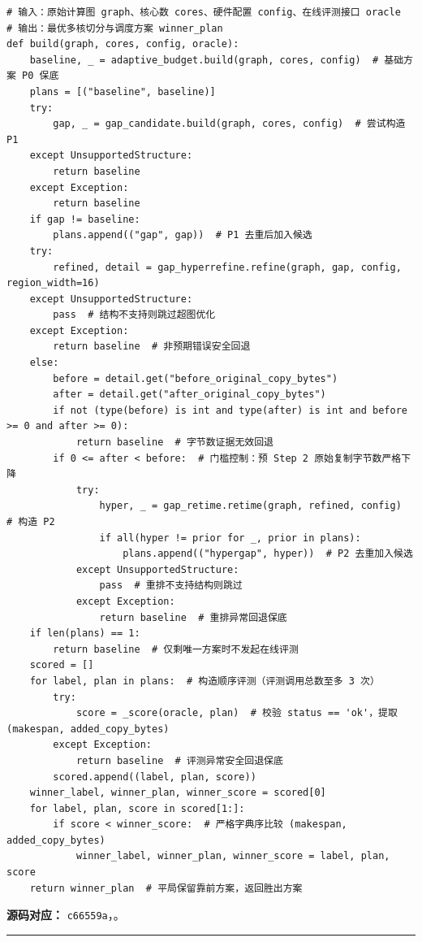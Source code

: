 \documentclass[anonymous,withtoc]{gmcm2026}
\begin{document}
\begin{lstlisting}[style=paperpseudo]
# 输入：原始计算图 graph、核心数 cores、硬件配置 config、在线评测接口 oracle
# 输出：最优多核切分与调度方案 winner_plan
def build(graph, cores, config, oracle):
    baseline, _ = adaptive_budget.build(graph, cores, config)  # 基础方案 P0 保底
    plans = [("baseline", baseline)]
    try:
        gap, _ = gap_candidate.build(graph, cores, config)  # 尝试构造 P1
    except UnsupportedStructure:
        return baseline
    except Exception:
        return baseline
    if gap != baseline:
        plans.append(("gap", gap))  # P1 去重后加入候选
    try:
        refined, detail = gap_hyperrefine.refine(graph, gap, config, region_width=16)
    except UnsupportedStructure:
        pass  # 结构不支持则跳过超图优化
    except Exception:
        return baseline  # 非预期错误安全回退
    else:
        before = detail.get("before_original_copy_bytes")
        after = detail.get("after_original_copy_bytes")
        if not (type(before) is int and type(after) is int and before >= 0 and after >= 0):
            return baseline  # 字节数证据无效回退
        if 0 <= after < before:  # 门槛控制：预 Step 2 原始复制字节数严格下降
            try:
                hyper, _ = gap_retime.retime(graph, refined, config)  # 构造 P2
                if all(hyper != prior for _, prior in plans):
                    plans.append(("hypergap", hyper))  # P2 去重加入候选
            except UnsupportedStructure:
                pass  # 重排不支持结构则跳过
            except Exception:
                return baseline  # 重排异常回退保底
    if len(plans) == 1:
        return baseline  # 仅剩唯一方案时不发起在线评测
    scored = []
    for label, plan in plans:  # 构造顺序评测（评测调用总数至多 3 次）
        try:
            score = _score(oracle, plan)  # 校验 status == 'ok'，提取 (makespan, added_copy_bytes)
        except Exception:
            return baseline  # 评测异常安全回退保底
        scored.append((label, plan, score))
    winner_label, winner_plan, winner_score = scored[0]
    for label, plan, score in scored[1:]:
        if score < winner_score:  # 严格字典序比较 (makespan, added_copy_bytes)
            winner_label, winner_plan, winner_score = label, plan, score
    return winner_plan  # 平局保留靠前方案，返回胜出方案
\end{lstlisting}
\textbf{源码对应：} \texttt{c66559a}，\texttt{}。

\par\hrule\endgroup
\end{document}
